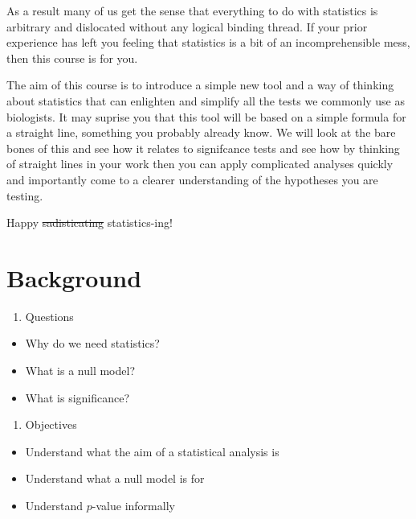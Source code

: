 \documentclass[
]{book}
\providecommand{\tightlist}{%
  \setlength{\itemsep}{0pt}\setlength{\parskip}{0pt}}
\begin{document}
As a result many of us get the sense that everything to do with statistics is arbitrary and dislocated without any logical binding thread. If your prior experience has left you feeling that statistics is a bit of an incomprehensible mess, then this course is for you.

The aim of this course is to introduce a simple new tool and a way of thinking about statistics that can enlighten and simplify all the tests we commonly use as biologists. It may suprise you that this tool will be based on a simple formula for a straight line, something you probably already know. We will look at the bare bones of this and see how it relates to signifcance tests and see how by thinking of straight lines in your work then you can apply complicated analyses quickly and importantly come to a clearer understanding of the hypotheses you are testing.

Happy \sout{sadisticating} statistics-ing!

\hypertarget{background}{%
\chapter{Background}\label{background}}

\begin{enumerate}
\def\labelenumi{\arabic{enumi}.}
\tightlist
\item
  Questions
\end{enumerate}

\begin{itemize}
\tightlist
\item
  Why do we need statistics?
\item
  What is a null model?
\item
  What is significance?
\end{itemize}

\begin{enumerate}
\def\labelenumi{\arabic{enumi}.}
\setcounter{enumi}{1}
\tightlist
\item
  Objectives
\end{enumerate}

\begin{itemize}
\tightlist
\item
  Understand what the aim of a statistical analysis is
\item
  Understand what a null model is for
\item
  Understand \(p\)-value informally
\end{itemize}
\end{document}
